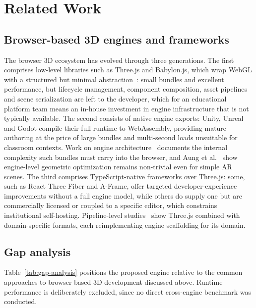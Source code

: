 \section{Related Work}

\subsection{Browser-based 3D engines and frameworks}
The browser 3D ecosystem has evolved through three generations. The first comprises low-level libraries such as Three.js and Babylon.js, which wrap WebGL with a structured but minimal abstraction~\cite{Evans2014}: small bundles and excellent performance, but lifecycle management, component composition, asset pipelines and scene serialization are left to the developer, which for an educational platform team means an in-house investment in engine infrastructure that is not typically available. The second consists of native engine exports: Unity, Unreal and Godot compile their full runtime to WebAssembly, providing mature authoring at the price of large bundles and multi-second loads unsuitable for classroom contexts. Work on engine architecture~\cite{Ullmann2025} documents the internal complexity such bundles must carry into the browser, and Aung et al.~\cite{Aung2022} show engine-level geometric optimization remains non-trivial even for simple AR scenes. The third comprises TypeScript-native frameworks over Three.js: some, such as React Three Fiber and A-Frame, offer targeted developer-experience improvements without a full engine model, while others do supply one but are commercially licensed or coupled to a specific editor, which constrains institutional self-hosting. Pipeline-level studies~\cite{Zhou2018,IMadeSuryaKumara2024} show Three.js combined with domain-specific formats, each reimplementing engine scaffolding for its domain.


\subsection{Gap analysis}

Table~\ref{tab:gap-analysis} positions the proposed engine relative to the common approaches to browser-based 3D development discussed above. Runtime performance is deliberately excluded, since no direct cross-engine benchmark was conducted.

